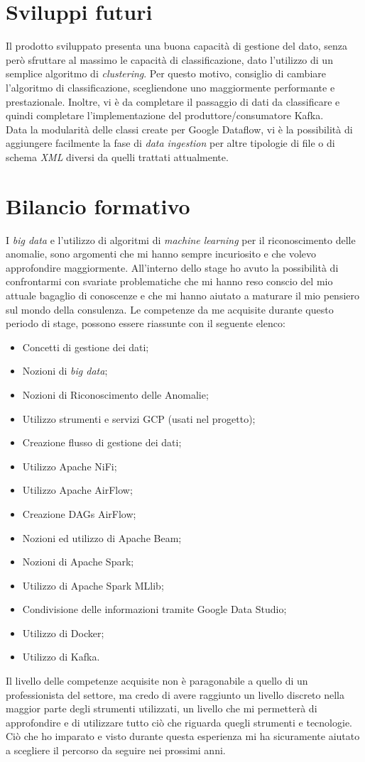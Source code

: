 \section{Sviluppi futuri}
Il prodotto sviluppato presenta una buona capacità di gestione del dato, senza però sfruttare al massimo le capacità di classificazione, dato l'utilizzo di un semplice algoritmo di \emph{clustering}. Per questo motivo, consiglio di cambiare l'algoritmo di classificazione, scegliendone uno maggiormente performante e prestazionale. Inoltre, vi è da completare il passaggio di dati da classificare e quindi completare l'implementazione del produttore/consumatore Kafka.
\\
Data la modularità delle classi create per Google Dataflow, vi è la possibilità di aggiungere facilmente la fase di \emph{data ingestion} per altre tipologie di file o di schema \emph{XML} diversi da quelli trattati attualmente.
\section{Bilancio formativo}
I \emph{big data} e l'utilizzo di algoritmi di \emph{machine learning} per il riconoscimento delle anomalie, sono argomenti che mi hanno sempre incuriosito e che volevo approfondire maggiormente. All'interno dello stage ho avuto la possibilità di confrontarmi con svariate problematiche che mi hanno reso conscio del mio attuale bagaglio di conoscenze e che mi hanno aiutato a maturare il mio pensiero sul mondo della consulenza.
Le competenze da me acquisite durante questo periodo di stage, possono essere riassunte con il seguente elenco:
\begin{itemize}
	\item Concetti di gestione dei dati; 
	\item Nozioni di \emph{big data};
	\item Nozioni di Riconoscimento delle Anomalie;
	\item Utilizzo strumenti e servizi GCP (usati nel progetto);
	\item Creazione flusso di gestione dei dati;
	\item Utilizzo Apache NiFi;
	\item Utilizzo Apache AirFlow;
	\item Creazione DAGs AirFlow;
	\item Nozioni ed utilizzo di Apache Beam;
	\item Nozioni di Apache Spark;
	\item Utilizzo di Apache Spark MLlib;
	\item Condivisione delle informazioni tramite Google Data Studio;
	\item Utilizzo di Docker;
	\item Utilizzo di Kafka.
\end{itemize}
Il livello delle competenze acquisite non è paragonabile a quello di un professionista del settore, ma credo di avere raggiunto un livello discreto nella maggior parte degli strumenti utilizzati, un livello che mi permetterà di approfondire e di utilizzare tutto ciò che riguarda quegli strumenti e tecnologie.
Ciò che ho imparato e visto durante questa esperienza mi ha sicuramente aiutato a scegliere il percorso da seguire nei prossimi anni.
